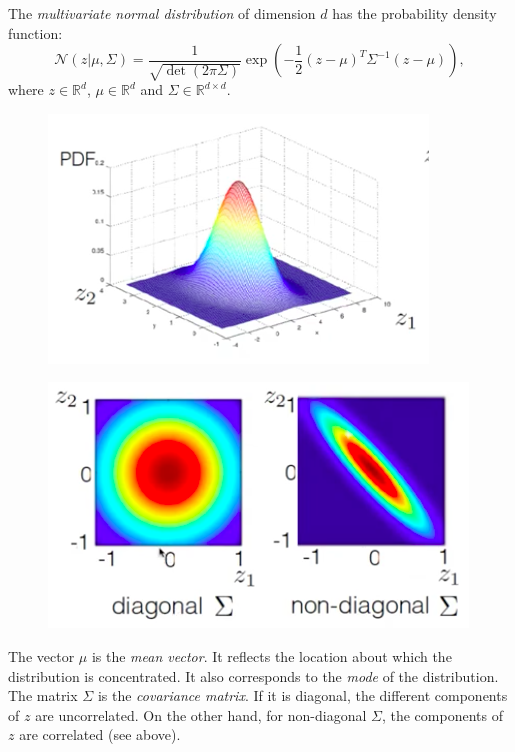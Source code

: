 \begin{framedef}
The \textit{multivariate normal distribution} of dimension $d$ has the probability density function:
\begin{equation*}
\mathcal{N}(z | \mu, \Sigma) = \frac{1}{\sqrt{\det(2 \pi \Sigma)}} \exp\left( - \frac{1}{2} (z - \mu)^T \Sigma^{-1} (z - \mu) \right),
\end{equation*}
where $z \in \mathbb{R}^d$, $\mu \in \mathbb{R}^d$ and $\Sigma \in \mathbb{R}^{d \times d}$. 

\begin{figure}[H]
\centering
\includegraphics[scale=0.4]{multinormal.png}
\end{figure}

\begin{figure}[H]
\centering
\includegraphics[scale=0.4]{multinormal2.png}
\end{figure}

The vector $\mu$ is the \textit{mean vector}. It reflects the location about which the distribution is concentrated. It also corresponds to the \textit{mode} of the distribution.\\

The matrix $\Sigma$ is the \textit{covariance matrix}. If it is diagonal, the different components of $z$ are uncorrelated. On the other hand, for non-diagonal $\Sigma$, the components of $z$ are correlated (see above). 
\end{framedef}

